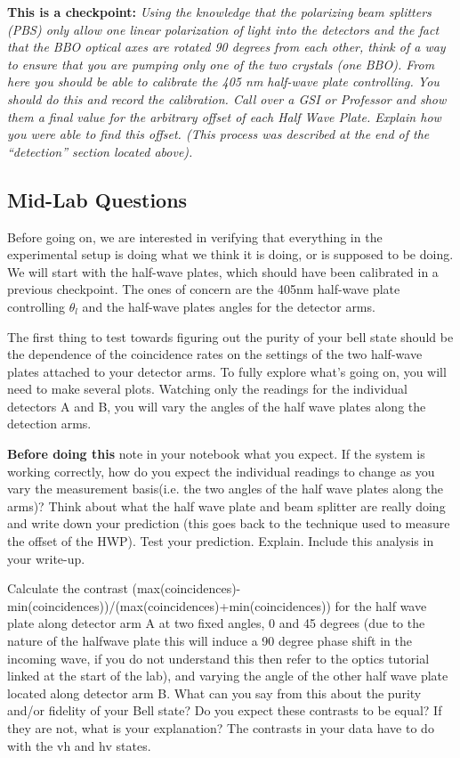 \documentclass{../lab}
\begin{document}
\textbf{This is a checkpoint:} \emph{Using the knowledge that the polarizing beam splitters (PBS) only allow one linear polarization of light into the detectors and the fact that the BBO optical axes are rotated 90 degrees from each other, think of a way to ensure that you are pumping only one of the two crystals (one BBO). From here you should be able to calibrate the 405 nm half-wave plate controlling. You should do this and record the calibration. Call over a GSI or Professor and show them a final value for the arbitrary offset of each Half Wave Plate. Explain how you were able to find this offset. (This process was described at the end of the ``detection'' section located above).}

\subsection{Mid-Lab Questions}

Before going on, we are interested in verifying that everything in the experimental setup is doing what we think it is doing, or is supposed to be doing. We will start with the half-wave plates, which should have been calibrated in a previous checkpoint. The ones of concern are the 405nm half-wave plate controlling $\theta_l$ and the half-wave plates angles for the detector arms.

The first thing to test towards figuring out the purity of your bell state should be the dependence of the coincidence rates on the settings of the two half-wave plates attached to your detector arms. To fully explore what's going on, you will need to make several plots. Watching only the readings for the individual detectors A and B, you will vary the angles of the half wave plates along the detection arms.

\textbf{Before doing this} note in your notebook what you expect. If the system is working correctly, how do you expect the individual readings to change as you vary the measurement basis(i.e. the two angles of the half wave plates along the arms)? Think about what the half wave plate and beam splitter are really doing and write down your prediction (this goes back to the technique used to measure the offset of the HWP). Test your prediction. Explain. Include this analysis in your write-up.

Calculate the contrast (max(coincidences)-min(coincidences))/(max(coincidences)+min(coincidences)) for the half wave plate along detector arm A at two fixed angles, 0 and 45 degrees (due to the nature of the halfwave plate this will induce a 90 degree phase shift in the incoming wave, if you do not understand this then refer to the optics tutorial linked at the start of the lab), and varying the angle of the other half wave plate located along detector arm B. What can you say from this about the purity and/or fidelity of your Bell state? Do you expect these contrasts to be equal? If they are not, what is your explanation? The contrasts in your data have to do with the vh and hv states.
\end{document}
